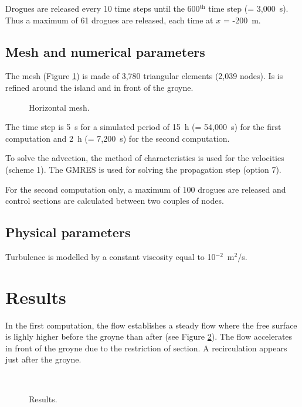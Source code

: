 Drogues are released every 10 time steps until the 600$^{\textrm{th}}$ time step
(= 3,000~s).
Thus a maximum of 61 drogues are released, each time at $x$ = -200~m.

\subsection{Mesh and numerical parameters}

The mesh (Figure \ref{t2d:flotteurs:fig:meshH})
is made of 3,780 triangular elements (2,039 nodes).
Is is refined around the island and in front of the groyne.

\begin{figure}[!htbp]
 \centering
 \caption{Horizontal mesh.}
 \label{t2d:flotteurs:fig:meshH}
\end{figure}

The time step is 5~s for a simulated period of 15~h (= 54,000~s) for the first
computation and 2~h (= 7,200~s) for the second computation.

To solve the advection, the method of characteristics
is used for the velocities (scheme 1).
The GMRES is used for solving the propagation step (option 7).

For the second computation only, a maximum of 100 drogues are released
and control sections are calculated between two couples of nodes.

\subsection{Physical parameters}

Turbulence is modelled by a constant viscosity equal to 10$^{-2}$~m$^2$/s.

\section{Results}

In the first computation, the flow establishes a steady flow where the free
surface is lighly higher before the groyne than after
(see Figure \ref{t2d:flotteurs:results1}).
The flow accelerates in front of the groyne due to the restriction of section.
A recirculation appears just after the groyne.

\begin{figure}[H]
  \centering
   \\
  \caption{Results.}\label{t2d:flotteurs:results1}
\end{figure}

